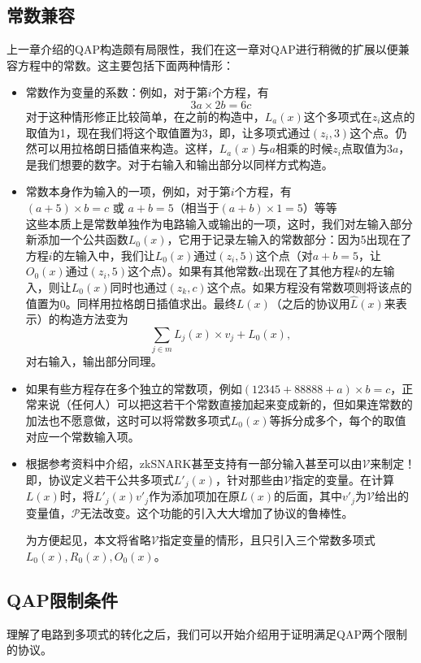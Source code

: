 \documentclass[12pt]{article}
\newcommand{\zk}{zkSNARK}
\newcommand{\pp}{$\mathcal{P}$}
\newcommand{\vv}{$\mathcal{V}$}
\begin{document}
\subsection{常数兼容}
上一章介绍的QAP构造颇有局限性，我们在这一章对QAP进行稍微的扩展以便兼容方程中的常数。这主要包括下面两种情形：
\begin{itemize}
	\item 常数作为变量的系数：例如，对于第$i$个方程，有
	         $$3a \times 2b = 6c$$
	         对于这种情形修正比较简单，在之前的构造中，$L_a(x)$这个多项式在$z_i$这点的取值为1，现在我们将这个取值置为3，即，让多项式通过$(z_i,3)$这个点。仍然可以用拉格朗日插值来构造。这样，$L_a(x)$与$a$相乘的时候$z_i$点取值为$3a$，是我们想要的数字。对于右输入和输出部分以同样方式构造。
	 \item 常数本身作为输入的一项，例如，对于第$i$个方程，有\\
	         $(a+5)\times b =c$ 或 $a+b=5$（相当于$(a+b)\times 1=5$）等等\\
	         这些本质上是常数单独作为电路输入或输出的一项，这时，我们对左输入部分新添加一个公共函数$L_0(x)$，它用于记录左输入的常数部分：因为5出现在了方程$i$的左输入中，我们让$L_0(x)$通过$(z_i,5)$这个点（对$a+b=5$，让$O_0(x)$通过$(z_i,5)$这个点）。如果有其他常数$c$出现在了其他方程$k$的左输入，则让$L_0(x)$同时也通过$(z_k,c)$这个点。如果方程没有常数项则将该点的值置为0。同样用拉格朗日插值求出。最终$L(x)$（之后的协议用$\hat{L}(x)$来表示）的构造方法变为
	         $$\sum_{j \in m} L_j(x)\times v_j+L_0(x),$$
	         对右输入，输出部分同理。
	 \item 如果有些方程存在多个独立的常数项，例如$(12345+88888+a)\times b = c $，正常来说（任何人）可以把这若干个常数直接加起来变成新的，但如果连常数的加法也不愿意做，这时可以将常数多项式$L_0(x)$等拆分成多个，每个的取值对应一个常数输入项。
	 \item 根据参考资料中介绍，\zk 甚至支持有一部分输入甚至可以由\vv 来制定！即，协议定义若干公共多项式$L'_j(x)$，针对那些由\vv 指定的变量。在计算$L(x)$时，将$L'_j(x)v'_j$作为添加项加在原$L(x)$的后面，其中$v'_j$为\vv 给出的变量值，\pp 无法改变。这个功能的引入大大增加了协议的鲁棒性。

	 为方便起见，本文将省略\vv 指定变量的情形，且只引入三个常数多项式$L_0(x),R_0(x),O_0(x)$。
\end{itemize}

\subsection{QAP限制条件}
理解了电路到多项式的转化之后，我们可以开始介绍用于证明满足QAP两个限制的协议。
\end{document}

